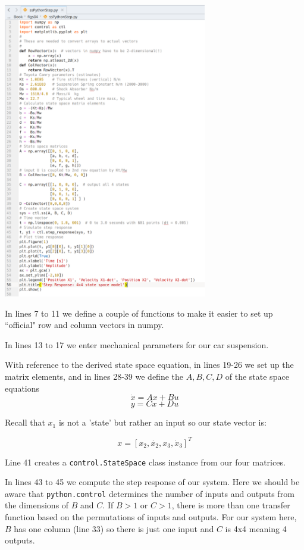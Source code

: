 \begin{center}
\includegraphics[width=3.5in]{figs04/python_ss_stepcode.png}
\end{center}


In lines 7 to 11 we define a couple of functions to make it easier to set up ``official"
row and column vectors in numpy.

In lines 13 to 17 we enter mechanical parameters for our car suspension.

With reference to the derived state space equation, in lines 19-26 we set
up the matrix elements, and in lines 28-39 we define the $A,B,C,D$ of the
state space equations
 \[
 \dot{x} = Ax+Bu
 \]
  \[
  y = Cx + Du
  \]

Recall that $x_1$ is not a 'state' but rather an input so our state vector is:

\[
x = [x_2,\dot{x_2},x_3,\dot{x}_3]^T
 \]

Line 41 creates a {\tt control.StateSpace} class instance from our four matrices.

In lines 43 to 45 we compute the step response of our system.   Here we should be aware
that {\tt python.control} determines the number of inputs and outputs from the dimensions of
$B$ and $C$.   If $B>1$ or $C>1$, there is more than one transfer function based on the
permutations of inputs and outputs.   For our system here, $B$ has one column (line 33) so there
is just one input and $C$ is 4x4 meaning 4 outputs.


